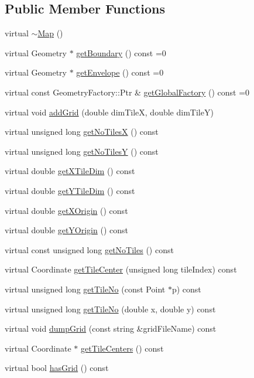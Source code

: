 \subsection*{Public Member Functions}
\begin{DoxyCompactItemize}
\item 
virtual \hyperlink{class_map_ac1ab46138aa61acd0a58b1fd21e0df37}{$\sim$\+Map} ()
\item 
virtual Geometry $\ast$ \hyperlink{class_map_aa6b66dc80060a42151228f3764db539f}{get\+Boundary} () const =0
\item 
virtual Geometry $\ast$ \hyperlink{class_map_a40854af632e83500ca5b44180eae8e87}{get\+Envelope} () const =0
\item 
virtual const Geometry\+Factory\+::\+Ptr \& \hyperlink{class_map_ab4dd1529d5c9ba2232108a2de2095b76}{get\+Global\+Factory} () const =0
\item 
virtual void \hyperlink{class_map_a24246583fbf3bbed56bfb5cd595f941f}{add\+Grid} (double dim\+TileX, double dim\+TileY)
\item 
virtual unsigned long \hyperlink{class_map_aace69b7294f0da0e2ca000dfa2a29606}{get\+No\+TilesX} () const
\item 
virtual unsigned long \hyperlink{class_map_a13ff108a9b56c432665d36ba1cbad1d0}{get\+No\+TilesY} () const
\item 
virtual double \hyperlink{class_map_a0a7326f8167effc1b6c0329de3c29d60}{get\+X\+Tile\+Dim} () const
\item 
virtual double \hyperlink{class_map_af36385173af71e8e0cd989dceb8f8aea}{get\+Y\+Tile\+Dim} () const
\item 
virtual double \hyperlink{class_map_af3e4dc640ee38ff6e77ab41435fcc42d}{get\+X\+Origin} () const
\item 
virtual double \hyperlink{class_map_a5bf4ef0a81f82df90465136c61a440bc}{get\+Y\+Origin} () const
\item 
virtual const unsigned long \hyperlink{class_map_a89abf4b20e4b0e54b706452e5caa61b3}{get\+No\+Tiles} () const
\item 
virtual Coordinate \hyperlink{class_map_a3ade598881798896b554f2ba34d8b499}{get\+Tile\+Center} (unsigned long tile\+Index) const
\item 
virtual unsigned long \hyperlink{class_map_af9727bc4d5a77cb35b60d92d0e176171}{get\+Tile\+No} (const Point $\ast$p) const
\item 
virtual unsigned long \hyperlink{class_map_ab68490803824fc485652757d992af18e}{get\+Tile\+No} (double x, double y) const
\item 
virtual void \hyperlink{class_map_afb74aa56fb64f4ab4857269c7924ec5a}{dump\+Grid} (const string \&grid\+File\+Name) const
\item 
virtual Coordinate $\ast$ \hyperlink{class_map_a6ff5cb95191b3a749f9a14b72eba2584}{get\+Tile\+Centers} () const
\item 
virtual bool \hyperlink{class_map_aca471e63e8f9f9a892a5491aee94eada}{has\+Grid} () const
\end{DoxyCompactItemize}
